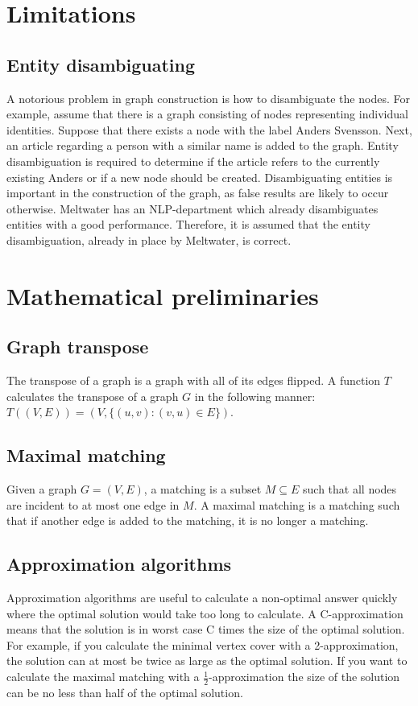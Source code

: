 \section{Limitations}
\subsection{Entity disambiguating}
A notorious problem in graph construction is how to disambiguate the nodes. For example, assume that there is a graph consisting of nodes representing individual identities. Suppose that there exists a node with the label Anders Svensson. Next, an article regarding a person with a similar name is added to the graph. Entity disambiguation is required to determine if the article refers to the currently existing Anders or if a new node should be created. Disambiguating entities is important in the construction of the graph, as false results are likely to occur otherwise. Meltwater has an NLP-department which already disambiguates entities with a good performance. Therefore, it is assumed that the entity disambiguation, already in place by Meltwater, is correct. 

\section{Mathematical preliminaries}

\subsection{Graph transpose}
The transpose of a graph is a graph with all of its edges flipped. A function $T$ calculates the transpose of a graph $G$ in the following manner: $T((V,E)) = (V,\{(u,v) : (v,u) \in E\})$.

\subsection{Maximal matching}
Given a graph $G = (V,E)$, a matching is a subset $M \subseteq E$ such that all nodes are incident to at most one edge in $M$. A maximal matching is a matching such that if another edge is added to the matching, it is no longer a matching. 

\subsection{Approximation algorithms}
Approximation algorithms are useful to calculate a non-optimal answer quickly where the optimal solution would take too long to calculate. A C-approximation means that the solution is in worst case C times the size of the optimal solution. For example, if you calculate the minimal vertex cover with a 2-approximation, the solution can at most be twice as large as the optimal solution. If you want to calculate the maximal matching with a $\frac{1}{2}$-approximation the size of the solution can be no less than half of the optimal solution.

